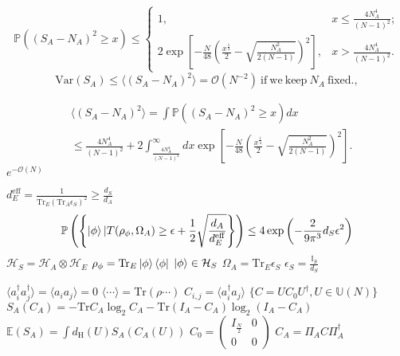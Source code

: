 \documentclass{beamer}
\begin{document}
\begin{frame}
   \[
\mathbb{P}((S_{A}-N_{A})^{2}\geq x)\leq\begin{cases}
1, & x\leq\frac{4N_{A}^{4}}{(N-1)^{2}};\\
2\exp\left[-\frac{N}{48}\left(\frac{x^{\frac{1}{4}}}{2}-\sqrt{\frac{N_{A}^{2}}{2(N-1)}}\right)^{2}\right], & x>\frac{4N_{A}^{4}}{(N-1)^{2}}.
\end{cases}
\]
\[
\mathrm{Var}(S_{A})\leq\langle(S_{A}-N_{A})^{2}\rangle=\mathcal{O}(N^{-2})\ \mathrm{if\ we\ keep}\ N_{A}\ \mathrm{fixed}.,
\]
\end{frame}
\begin{frame}
   \begin{align*}
&\langle(S_{A}-N_{A})^{2}\rangle =\int\mathbb{P}((S_{A}-N_{A})^{2}\geq x)dx\\
 & \leq\frac{4N_{A}^{4}}{(N-1)^{2}}+2\int_{\frac{4N_{A}^{4}}{(N-1)^{2}}}^{\infty}dx\exp\left[-\frac{N}{48}\left(\frac{x^{\frac{1}{4}}}{2}-\sqrt{\frac{N_{A}^{2}}{2(N-1)}}\right)^{2}\right].
\end{align*}
$e^{-\mathcal{O}(N)}$
\end{frame}
\begin{frame}
   $d_{E}^{\mathrm{eff}}=\frac{1}{\mathrm{Tr}_{E}(\mathrm{Tr}_{A}\epsilon_{S})^{2}}\geq\frac{d_{S}}{d_{A}}$
   \begin{equation*}
   \mathbb{P}\left(\left\{ \ket{\phi}|T(\rho_{\phi},\Omega_{A})\geq\epsilon+\frac{1}{2}\sqrt{\frac{d_{A}}{d_{E}^{\mathrm{eff}}}}\right\} \right)\leq4\exp{\left(-\frac{2}{9\pi^{3}}d_{S}\epsilon^{2}\right)}
   \end{equation*}
   $\mathcal{H}_S=\mathcal{H}_A\otimes\mathcal{H}_E$
   $\rho_{\phi}=\mathrm{Tr}_E\ket{\phi}\bra{\phi}$
   $\ket{\phi}\in\mathcal{H}_S$
   $\Omega_{A}=\mathrm{Tr}_E\epsilon_S$
   $\epsilon_S=\frac{\mathbb{I}_S}{d_S}$
\end{frame}
\begin{frame}
   $\langle a_{i}^{\dagger}a_{j}^{\dagger}\rangle=\langle a_{i}a_{j}\rangle=0$
    $\langle\cdots\rangle=\mathrm{Tr}(\rho\cdots)$
    $C_{i,j}=\langle a_i^\dag a_{j}\rangle$
    $\{C=UC_{0}U^{\dagger},U\in\mathbb{U}(N)\}$
    $S_{A}(C_{A})=-\mathrm{Tr} C_{A}\log_{2}C_{A}-\mathrm{Tr}(I_{A}-C_{A})\log_{2}(I_{A}-C_{A})$
    $\mathbb{E}(S_{A})=\int d_{\mathrm{H}}(U)S_{A}(C_{A}(U))$
$C_{0}=\begin{pmatrix}I_{\frac{N}{2}} & 0\\
0 & 0
\end{pmatrix}$
$C_{A}=\Pi_A C \Pi_A^{\dagger}$
\end{frame}
\end{document}
